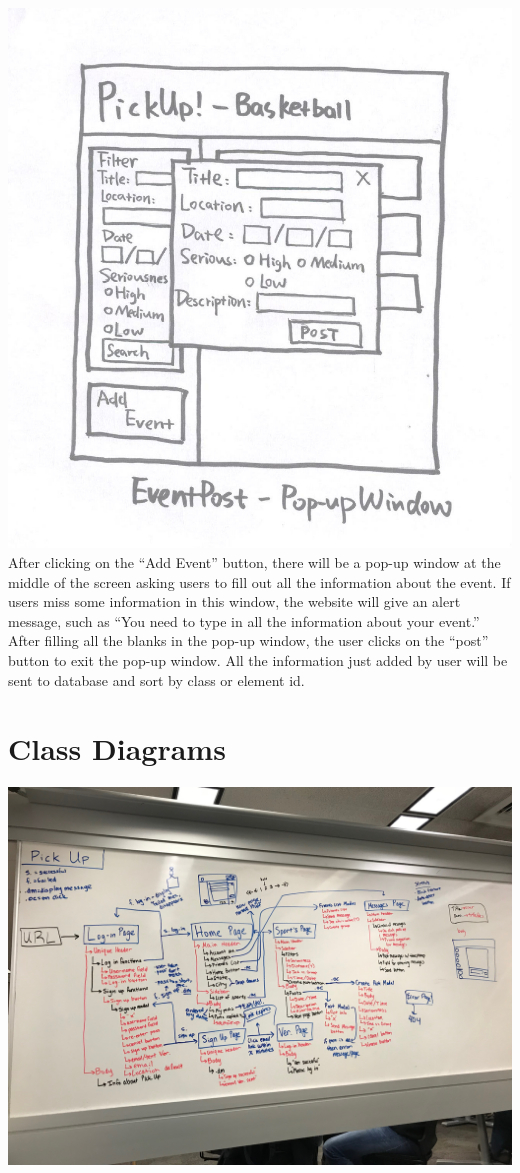 \documentclass[a4paper]{article}
\begin{document}
\includegraphics[width=\textwidth]{images/post_pop-up_window.pdf}
After clicking on the “Add Event” button, there will be a pop-up window at the middle of the screen asking users to fill out all the information about the event. If users miss some information in this window, the website will give an alert message, such as “You need to type in all the information about your event.” After filling all the blanks in the pop-up window, the user clicks on the “post” button to exit the pop-up window. All the information just added by user will be sent to database and sort by class or element id. 

\section{Class Diagrams}
\includegraphics[width=\textwidth]{images/pic1.jpg}
\end{document}
